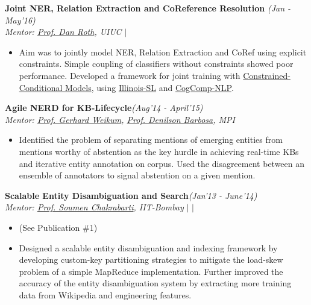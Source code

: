 \vspace{-0.1cm}    
\textsf{\textbf{Joint NER, Relation Extraction and CoReference Resolution}} \hfill\textit{\small(Jan - May'16)}
\\ {\textit{Mentor: \href{http://www.cis.upenn.edu/~danroth/}{Prof. Dan Roth}, UIUC}} \hfill{ $|$ }
\normalsize
\begin{itemize}[leftmargin=*]\compresslist
\item[] Aim was to jointly model NER, Relation Extraction and CoRef using explicit constraints. Simple coupling of classifiers without constraints showed poor performance. Developed a framework for joint training with \href{https://en.wikipedia.org/wiki/Constrained_conditional_model}{Constrained-Conditional Models}, using \href{https://github.com/CogComp/illinois-sl}{Illinois-SL} and \href{https://github.com/CogComp/cogcomp-nlp}{CogComp-NLP}. 
\end{itemize}
\textsf{\textbf{Agile NERD for KB-Lifecycle}}\hfill\textit{\small(Aug'14 - April'15)}
\\ {\textit{Mentor: \href{https://people.mpi-inf.mpg.de/~weikum/}{Prof. Gerhard Weikum}, \href{https://sites.ualberta.ca/~denilson/}{Prof. Denilson Barbosa}, MPI}} \hfill{}
\begin{itemize}[leftmargin=*]\compresslist
\item[] Identified the problem of separating mentions of emerging entities from mentions worthy of abstention as the key hurdle in achieving real-time KBs and iterative entity annotation on corpus. Used the disagreement between an ensemble of annotators to signal abstention on a given mention.
\end{itemize}

\textsf{\textbf{Scalable Entity Disambiguation and Search}}\hfill\textit{\small(Jan'13 - June'14)}
\\ {\textit{Mentor: \href{https://www.cse.iitb.ac.in/~soumen/}{Prof. Soumen Chakrabarti}, IIT-Bombay}}\hfill{ $|$  $|$ }
\begin{itemize}[leftmargin=*]\compresslist
    \item[] (See Publication \#1)\vspace{-1mm}
    \item[] Designed a scalable entity disambiguation and indexing framework by developing custom-key partitioning strategies to mitigate the load-skew problem of a simple MapReduce implementation. Further improved the accuracy of the entity disambiguation system by extracting more training data from Wikipedia and engineering features. %
\end{itemize}

